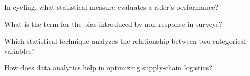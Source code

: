 \begin{enhancedmcq}{In cycling, what statistical measure evaluates a rider's performance?}
\end{enhancedmcq}

\begin{enhancedmcq}{What is the term for the bias introduced by non‑response in surveys?}
\end{enhancedmcq}

\begin{enhancedmcq}{Which statistical technique analyzes the relationship between two categorical variables?}
\end{enhancedmcq}

\begin{enhancedmcq}{How does data analytics help in optimizing supply‑chain logistics?}
\end{enhancedmcq}